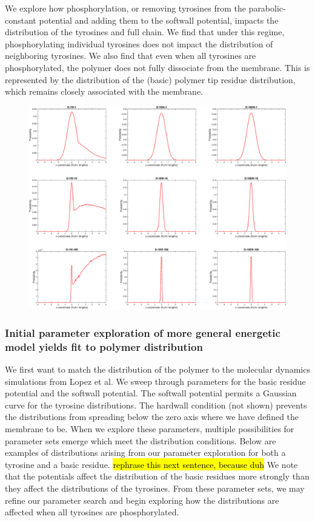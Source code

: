 \documentclass[../../AdvancementSummary.tex]{subfiles}
\begin{document}
We explore how phosphorylation, or removing tyrosines from the parabolic-constant potential and adding them to the softwall potential, impacts the distribution of the tyrosines and full chain. We find that under this regime, phosphorylating individual tyrosines does not impact the distribution of neighboring tyrosines. We also find that even when all tyrosines are phosphorylated, the polymer does not fully dissociate from the membrane. This is represented by the distribution of the (basic) polymer tip residue distribution, which remains closely associated with the membrane. 

\begin{figure}
\begin{center}
\includegraphics[width=0.8\linewidth]{ResultsFigures/CD3ZetaSoftwallPiecewiseBasicsY/DistributioniSite7.eps}
\end{center}
\caption{}
\end{figure}








\subsubsection{Initial parameter exploration of more general energetic model yields fit to polymer distribution}

We first want to match the distribution of the polymer to the molecular dynamics simulations from Lopez et al. We sweep through parameters for the basic residue potential and the softwall potential. The softwall potential permits a Gaussian curve for the tyrosine distributions.  The hardwall condition (not shown) prevents the distributions from spreading below the zero axis where we have defined the membrane to be. When we explore these parameters, multiple possibilities for parameter sets emerge which meet the distribution conditions. Below are examples of distributions arising from our parameter exploration for both a tyrosine and a basic residue. \hl{rephrase this next sentence, because duh} We note that the potentials affect the distribution of the basic residues more strongly than they affect the distributions of the tyrosines. From these parameter sets, we may refine our parameter search and begin exploring how the distributions are affected when all tyrosines are phosphorylated. 
\end{document}

